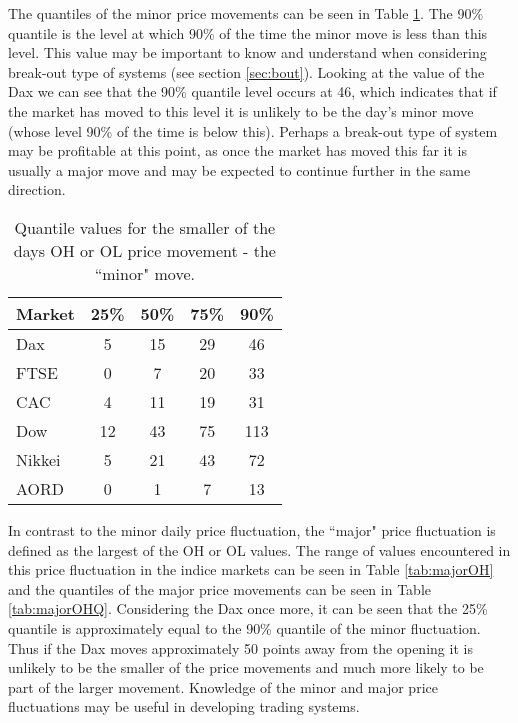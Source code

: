 The quantiles of the minor price movements can be seen in Table \ref{tab:minorOHQ}. The 90\% quantile is the level at which 90\% of the time the minor move is less than this level.  This value may be important to know and understand when considering break-out type of systems (see section \ref{sec:bout}).  Looking at the value of the Dax we can see that the 90\% quantile level occurs at 46, which indicates that if the market has moved to this level it is unlikely to be the day's minor move (whose level 90\% of the time is below this).  Perhaps a break-out type of system may be profitable at this point, as once the market has moved this far it is usually a major move and may be expected to continue further in the same direction.

\begin{table}[!htbp] \centering 
  \caption[Quantiles of Minor daily price fluctuation.]{Quantile values for the smaller of the days OH or OL price movement - the \textquotedblleft minor" move.} 
  \label{tab:minorOHQ}
\begin{tabular}{lcccc} 
\toprule 
Market & 25\% & 50\% & 75\% & 90\% \\ 
\midrule
Dax  & 5  & 15 & 29 & 46  \\ 
FTSE & 0  & 7 & 20 & 33 \\ 
CAC  & 4  & 11 & 19 & 31 \\ 
Dow  & 12 & 43  & 75 & 113 \\ 
Nikkei & 5  & 21  & 43 & 72 \\ 
AORD   & 0  & 1  & 7 & 13\\ 
\bottomrule
\end{tabular} 
\end{table} 

In contrast to the minor daily price fluctuation, the \textquotedblleft major" price fluctuation is defined as the largest of the OH or OL values.  The range of values encountered in this price fluctuation in the indice markets can be seen in Table \ref{tab:majorOH} and the quantiles of the major price movements can be seen in Table \ref{tab:majorOHQ}. Considering the Dax once more, it can be seen that the 25\% quantile is approximately equal to the 90\% quantile of the minor fluctuation. Thus if the Dax moves approximately 50 points away from the opening it is unlikely to be the smaller of the price movements and much more likely to be part of the larger movement. Knowledge of the minor and major price fluctuations may be useful in developing trading systems. 

